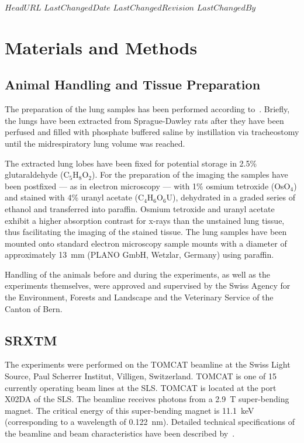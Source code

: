 \svnidlong
{$HeadURL$}
{$LastChangedDate$}
{$LastChangedRevision$}
{$LastChangedBy$}
\section{Materials and Methods}
\label{sec:materials and methods}
\subsection{Animal Handling and Tissue Preparation}
The preparation of the lung samples has been performed according to~\citet{Schittny1997,Schittny1998}. Briefly, the lungs have been extracted from Sprague-Dawley rats after they have been perfused and filled with phosphate buffered saline by instillation via tracheostomy until the midrespiratory lung volume was reached.

The extracted lung lobes have been fixed for potential storage in 2.5\% glutaraldehyde (C$_5$H$_8$O$_2$). For the preparation of the imaging the samples have been postfixed --- as in electron microscopy --- with 1\% osmium tetroxide (OsO$_4$) and stained with 4\% uranyl acetate (C$_4$H$_6$O$_6$U), dehydrated in a graded series of ethanol and transferred into paraffin. Osmium tetroxide and uranyl acetate exhibit a higher absorption contrast for x-rays than the unstained lung tissue, thus facilitating the imaging of the stained tissue. The lung samples have been mounted onto standard electron microscopy sample mounts with a diameter of approximately \SI{13}{\milli\meter} (PLANO GmbH, Wetzlar, Germany) using paraffin.

Handling of the animals before and during the experiments, as well as the experiments themselves, were approved and supervised by the Swiss Agency for the Environment, Forests and Landscape and the Veterinary Service of the Canton of Bern.

\subsection{SRXTM}
The experiments were performed on the TOMCAT beamline at the Swiss Light Source, Paul Scherrer Institut, Villigen, Switzerland. TOMCAT is one of 15 currently operating beam lines at the SLS. TOMCAT is located at the port X02DA of the SLS. The beamline receives photons from a \SI{2.9}{\tesla} super-bending magnet. The critical energy of this super-bending magnet is \SI{11.1}{\kilo\electronvolt} (corresponding to a wavelength of \SI{0.122}{\nano\meter}). Detailed technical specifications of the beamline and beam characteristics have been described by~\citet{Stampanoni2006a,Stampanoni2007}.

